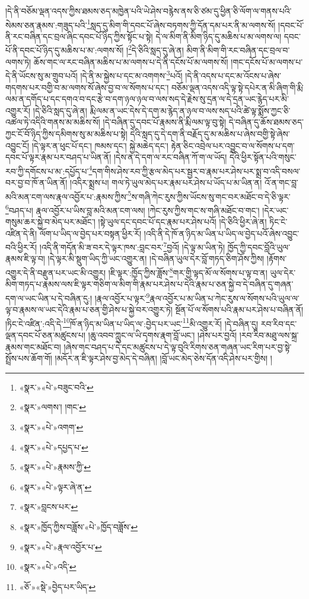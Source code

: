 །དེ་ནི་བཅོམ་ལྡན་འདས་ཀྱིས་ཐམས་ཅད་མཁྱེན་པའི་ཡེ་ཤེས་བརྙེས་ནས་ཅི་ཙམ་དུ་ཕྱིན་ཅི་ལོག་ལ་གནས་པའི་སེམས་ཅན་རྣམས་:གཟུད་པའི་\footnote{«སྣར་»«པེ་»བཟུང་བའི་}སླད་དུ་མིག་གི་དབང་པོ་ཞེས་བཏགས་ཀྱི་དོན་དམ་པར་ནི་མ་ལགས་སོ། །དབང་པོ་ནི་རང་བཞིན་དང་བྲལ་ཞིང་དབང་པོ་ཉིད་ཀྱིས་སྟོང་པ་སྟེ། དེ་ལ་མིག་ནི་མིག་ཉིད་དུ་མཆིས་པ་མ་ལགས་ལ། དབང་པོ་ནི་དབང་པོ་ཉིད་དུ་མཆིས་པ་མ་:ལགས་སོ། །\footnote{«སྣར་»ལགས་། །གང་}དེ་ཅིའི་སླད་དུ་ཞེ་ན། མིག་ནི་མིག་གི་རང་བཞིན་དང་བྲལ་བ་ལགས་ཏེ། ཆོས་གང་ལ་རང་བཞིན་མཆིས་པ་མ་ལགས་པ་དེ་ནི་དངོས་པོ་མ་ལགས་སོ། །གང་དངོས་པོ་མ་ལགས་པ་དེ་ནི་ཡོངས་སུ་མ་གྲུབ་པའོ། །དེ་ནི་མ་སྐྱེས་པ་དང་མ་འགགས་\footnote{«སྣར་»«པེ་»འགག་}པའོ། །དེ་ནི་འདས་པ་དང་མ་འོངས་པ་ཞེས་གདགས་པར་བགྱི་བ་མ་ལགས་སོ་ཞེས་བྱ་བ་ལ་སོགས་པ་དང་། བཅོམ་ལྡན་འདས་འདི་ལྟ་སྟེ་དཔེར་ན་མི་ཞིག་གི་རྨི་ལམ་ན་དགོད་པ་དང་དགའ་བ་དང་རྩེ་བ་དག་ཉལ་ཉལ་བ་ལས་སད་དེ་རྗེས་སུ་དྲན་ལ་དེ་དྲན་ཡང་རྙེད་པར་མི་འགྱུར་རོ། །དེ་ཅིའི་སླད་དུ་ཞེ་ན། རྨི་ལམ་ན་ཡང་དེས་དེ་དག་མ་རྙེད་ན་ཉལ་བ་ལས་སད་པའི་ཚེ་ལྟ་སྨོས་ཀྱང་ཅི་འཚལ་ཏེ་འདིའི་གནས་མ་མཆིས་སོ། །དེ་བཞིན་དུ་དབང་པོ་རྣམས་ནི་རྨི་ལམ་ལྟ་བུ་སྟེ། དེ་བཞིན་དུ་ཆོས་ཐམས་ཅད་ཀྱང་ངོ་བོ་ཉིད་ཀྱིས་དམིགས་སུ་མ་མཆིས་པ་སྟེ། དེའི་སླད་དུ་དེ་དག་ནི་བརྗོད་དུ་མ་མཆིས་པ་ཞེས་བགྱི་སྟེ་ཞེས་འབྱུང་ངོ། །དེ་ལྟར་ན་ཕུང་པོ་དང་། ཁམས་དང་། སྐྱེ་མཆེད་དང་། རྟེན་ཅིང་འབྲེལ་པར་འབྱུང་བ་ལ་སོགས་པ་དག་དབང་པོ་ལྟར་རྣམ་པར་བཤད་པ་ཡིན་ནོ། །དེས་ན་དེ་དག་ལ་རང་བཞིན་ཀོ་ག་ལ་ཡོད། དེའི་ཕྱིར་སྟོན་པའི་གསུང་རབ་ཀྱི་དགོངས་པ་མ་:དཔྱོད་པ་\footnote{«སྣར་»«པེ་»དཔྱད་པ་}དག་གིས་ཤེས་རབ་ཀྱི་རྩལ་མེད་པར་སྦྱར་བ་རྣམ་པར་ཤེས་པར་སྨྲ་བ་འདི་བསལ་བར་བྱ་བ་ཁོ་ན་ཡིན་ནོ། །འདིར་སྨྲས་པ། གལ་ཏེ་ཡུལ་མེད་པར་རྣམ་པར་ཤེས་པ་ཡོད་པ་མ་ཡིན་ན། འོ་ན་གང་བླ་མའི་མན་ངག་ལས་རྣལ་འབྱོར་པ་:རྣམས་ཀྱིས་\footnote{«སྣར་»«པེ་»རྣམས་ཀྱི་}ས་གཞི་ཀེང་རུས་ཀྱིས་ཡོངས་སུ་གང་བར་མཐོང་བ་དེ་ཅི་ལྟར་\footnote{«སྣར་»«པེ་»ལྟར་ཞེ་ན་}བཤད་པ། རྣལ་འབྱོར་པ་ཡིས་བླ་མའི་མན་ངག་ལས། །ཀེང་རུས་ཀྱིས་གང་ས་གཞི་མཐོང་བ་གང་། །དེར་ཡང་གསུམ་ཆར་སྐྱེ་བ་མེད་པར་མཐོང་། །སྟེ་ཡུལ་དང་དབང་པོ་དང་རྣམ་པར་ཤེས་པའོ། །དེ་ཅིའི་ཕྱིར་ཞེ་ན། ཏིང་ངེ་འཛིན་དེ་ནི། ལོག་པ་ཡིད་ལ་བྱེད་པར་བསྟན་ཕྱིར་རོ། །འདི་ནི་དེ་ཁོ་ན་ཉིད་མ་ཡིན་པ་ཡིད་ལ་བྱེད་པའོ་ཞེས་འབྱུང་བའི་ཕྱིར་རོ། །འདི་ནི་གདོན་མི་ཟ་བར་དེ་ལྟར་ཁས་:བླང་བར་\footnote{«སྣར་»བླངས་པར་}བྱའོ། །དེ་ལྟ་མ་ཡིན་ཏེ། ཁྱོད་ཀྱི་དབང་བློའི་ཡུལ་རྣམས་ཇི་ལྟ་བ། །དེ་ལྟར་མི་སྡུག་ཡིད་ཀྱི་ཡང་འགྱུར་ན། །དེ་བཞིན་ཡུལ་དེར་བློ་གཏད་ཅིག་ཤོས་ཀྱིས། །རྟོགས་འགྱུར་དེ་ནི་བརྫུན་པར་ཡང་མི་འགྱུར། །ཇི་ལྟར་:ཁྱོད་ཀྱིས་ཟློས་\footnote{«སྣར་»ཁྱོད་ཀྱིས་བཟློས་«པེ་»ཁྱོད་བཟློས་}གར་གྱི་ལྟད་མོ་ལ་སོགས་པ་ལྟ་བ་ན། ཡུལ་དེར་མིག་གཏད་པ་རྣམས་ལས་ཇི་ལྟར་གཅིག་ལ་མིག་གི་རྣམ་པར་ཤེས་པ་དེའི་རྣམ་པ་ཅན་སྐྱེ་བ་དེ་བཞིན་དུ་གཞན་དག་ལ་ཡང་ཡིན་པ་དེ་བཞིན་དུ:། །རྣལ་འབྱོར་པ་ལྟར་\footnote{«སྣར་»«པེ་»རྣལ་འབྱོར་པ་}རྣལ་འབྱོར་པ་མ་ཡིན་པ་ཀེང་རུས་ལ་སོགས་པའི་ཡུལ་ལ་ལྟ་བ་རྣམས་ལ་ཡང་དེའི་རྣམ་པ་ཅན་གྱི་ཤེས་པ་སྐྱེ་བར་འགྱུར་ཏེ། སྔོན་པོ་ལ་སོགས་པའི་རྣམ་པར་ཤེས་པ་བཞིན་ནོ། །ཏིང་ངེ་འཛིན་:འདི་དེ་\footnote{«སྣར་»«པེ་»འདི་}ཁོ་ན་ཉིད་མ་ཡིན་པ་ཡིད་ལ་:བྱེད་པར་ཡང་\footnote{«ཅོ་»«སྡེ་»བྱེད་པར་ཡིད་}མི་འགྱུར་རོ། །དེ་བཞིན་དུ། རབ་རིབ་དང་ལྡན་དབང་པོ་ཅན་མཚུངས་པ། །ཆུ་འབབ་ཀླུང་ལ་ཡི་དྭགས་རྣག་བློ་ཡང་། །ཤེས་པར་བྱའོ། །རབ་རིབ་མཐུ་ལས་སྐྲ་རྣམས་གང་མཐོང་བ། །ཞེས་གང་བཤད་པ་དེ་དང་མཚུངས་པ་དེ་ལྟ་བུའི་རིགས་ཅན་གཞན་ཡང་རིག་པར་བྱ་སྟེ་སྤྲོས་པས་ཆོག་གོ། །མདོར་ན་ཇི་ལྟར་ཤེས་བྱ་མེད་དེ་བཞིན། །བློ་ཡང་མེད་ཅེས་དོན་འདི་ཤེས་པར་གྱིས། །
